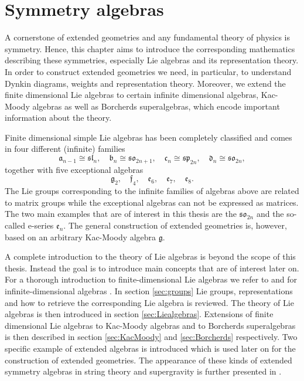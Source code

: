 \chapter{Symmetry algebras}\label{chap:symmetries}
A cornerstone of extended geometries and any fundamental theory of physics is symmetry. Hence, this chapter aims to introduce the corresponding mathematics describing these symmetries, especially Lie algebras and its representation theory. In order to construct extended geometries we need, in particular, to understand Dynkin diagrams, weights and representation theory. Moreover, we extend the finite dimensional Lie algebras to certain infinite dimensional algebras, Kac-Moody algebras as well as Borcherds superalgebras, which encode important information about the theory. 

Finite dimensional simple Lie algebras has been completely classified and comes in four different (infinite) families 
\begin{equation*}
    \mathfrak{a}_{n-1} \cong \mathfrak{sl}_{n},\quad \mathfrak{b}_{n}\cong \mathfrak{so}_{2n+1},\quad \mathfrak{c}_{n} \cong \mathfrak{sp}_{2n},\quad \mathfrak{d}_{n}\cong \mathfrak{so}_{2n},
\end{equation*}
together with five exceptional algebras
\begin{equation*}
    \mathfrak{g}_2,\quad \mathfrak{f}_4,\quad\mathfrak{e_6},\quad \mathfrak{e_7},\quad \mathfrak{e_8}.
\end{equation*}
The Lie groups corresponding to the infinite families of algebras above are related to matrix groups while the exceptional algebras can not be expressed as matrices. The two main examples that are of interest in this thesis are the $\mathfrak{so}_{2n}$ and the so-called e-series $\mathfrak{e}_n$. The general construction of extended geometries is, however, based on an arbitrary Kac-Moody algebra $\mathfrak{g}$. 

A complete introduction to the theory of Lie algebras is beyond the scope of this thesis. Instead the goal is to introduce main concepts that are of interest later on. For a thorough introduction to finite-dimensional Lie algebras we refer to \cite{Fuchs1997,FultonHarris2004,Gaberdiel2013} and for infinite-dimensional algebras \cite{Kac1990}. In section \ref{sec:groups} Lie groups, representations and how to retrieve the corresponding Lie algebra is reviewed. The theory of Lie algebras is then introduced in section \ref{sec:Liealgebras}. Extensions of finite dimensional Lie algebras to Kac-Moody algebras and to Borcherds superalgebras is then described in section \ref{sec:KacMoody} and \ref{sec:Borcherds} respectively. Two specific example of extended algebras is introduced which is used later on for the construction of extended geometries. The appearance of these kinds of extended symmetry algebras in string theory and supergravity is further presented in \cite{CederwallPalmkvistSuperalgebras2015,Aldazabal2014,Palmkvist2015ExpGeomSuperAlg,deWitTensorHierarchies2008}.



